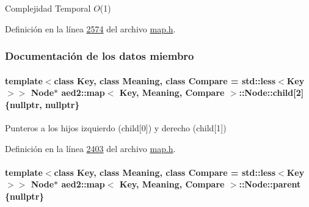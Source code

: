 \begin{DoxyDescription}
\item[Complejidad Temporal]$O$(1)
\end{DoxyDescription}

Definición en la línea \hyperlink{map_8h_source_l02574}{2574} del archivo \hyperlink{map_8h_source}{map.\+h}.



\subsubsection{Documentación de los datos miembro}
\paragraph[{\texorpdfstring{child}{child}}]{\setlength{\rightskip}{0pt plus 5cm}template$<$class Key, class Meaning, class Compare = std\+::less$<$\+Key$>$$>$ {\bf Node}$\ast$ {\bf aed2\+::map}$<$ Key, Meaning, Compare $>$\+::Node\+::child\mbox{[}2\mbox{]} \{nullptr, nullptr\}}\hypertarget{structaed2_1_1map_1_1Node_a7d65c374c73c443a46d8fc224aff9e82_a7d65c374c73c443a46d8fc224aff9e82}{}\label{structaed2_1_1map_1_1Node_a7d65c374c73c443a46d8fc224aff9e82_a7d65c374c73c443a46d8fc224aff9e82}


Punteros a los hijos izquierdo (child\mbox{[}0\mbox{]}) y derecho (child\mbox{[}1\mbox{]}) 



Definición en la línea \hyperlink{map_8h_source_l02403}{2403} del archivo \hyperlink{map_8h_source}{map.\+h}.

\paragraph[{\texorpdfstring{parent}{parent}}]{\setlength{\rightskip}{0pt plus 5cm}template$<$class Key, class Meaning, class Compare = std\+::less$<$\+Key$>$$>$ {\bf Node}$\ast$ {\bf aed2\+::map}$<$ Key, Meaning, Compare $>$\+::Node\+::parent \{nullptr\}}\hypertarget{structaed2_1_1map_1_1Node_ab6a5f9e471b311755e4a56834086cb90_ab6a5f9e471b311755e4a56834086cb90}{}\label{structaed2_1_1map_1_1Node_ab6a5f9e471b311755e4a56834086cb90_ab6a5f9e471b311755e4a56834086cb90}



